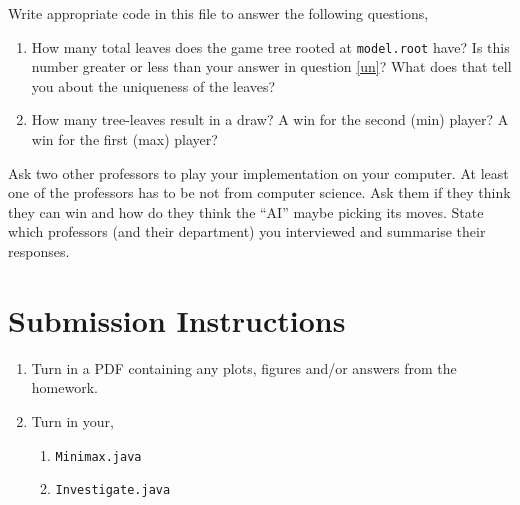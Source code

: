 \documentclass{homework}
\begin{document}
Write appropriate code in this file to answer the following questions,

\begin{enumerate}
    \item How many total leaves does the game tree rooted at \texttt{model.root} have? Is this number greater or less than your answer in question \ref{un}? What does that tell you about the uniqueness of the leaves?
    \item How many tree-leaves result in a draw? A win for the second (min) player? A win for the first (max) player?
\end{enumerate}

\question Ask two other professors to play your implementation on your computer.  At least one of the professors has to be not from computer science.  Ask them if they think they can win and how do they think the ``AI'' maybe picking its moves.  State which professors (and their department) you interviewed and summarise their responses.

\section*{Submission Instructions}

\begin{enumerate}
    \item Turn in a PDF containing any plots, figures and/or answers from the homework.
    \item Turn in your,
    \begin{enumerate}[label=\roman*)]
        \item \texttt{Minimax.java}
        \item \texttt{Investigate.java}
    \end{enumerate}
\end{enumerate}
\end{document}
